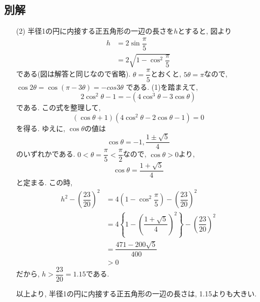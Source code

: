 \documentclass[dvipdfmx,a4paper]{jsarticle}
\begin{document}
    \subsection{別解}
    \begin{itemize}
        \item [(2)] 半径1の円に内接する正五角形の一辺の長さを$h$とすると, 
        図より
        \begin{align*}
            h &= 2 \sin \dfrac{\pi}{5} \\
            &= 2 \sqrt{1 - \cos^2 \dfrac{\pi}{5}}
        \end{align*}
        である(図は解答と同じなので省略). 
        $\theta = \dfrac{\pi}{5}$とおくと, $5\theta = \pi$なので, $\cos 2\theta = \cos (\pi - 3\theta) = - cos 3\theta$
        である. (1)を踏まえて, 
        \begin{equation*}
            2\cos^2 \theta -1 = - \left(4\cos^3 \theta -3 \cos \theta \right)
        \end{equation*}
        である. この式を整理して, 
        \begin{equation*}
            (\cos \theta + 1)(4 \cos^2 \theta -2 \cos \theta -1) = 0
        \end{equation*}
        を得る. ゆえに, $\cos \theta$の値は
        \begin{equation*}
            \cos \theta = -1, \dfrac{1 \pm \sqrt{5}}{4}
        \end{equation*}
        のいずれかである. $0 < \theta = \dfrac{\pi}{5} < \dfrac{\pi}{2}$なので, 
        $\cos \theta > 0$より, 
        \begin{equation*}
            \cos \theta = \dfrac{1 + \sqrt{5}}{4}
        \end{equation*}
        と定まる. 
        この時, 
        \begin{align*}
            h^2 - \left(\dfrac{23}{20}\right)^2 
            &= 4\left(1 - \cos^2 \dfrac{\pi}{5}\right) - \left(\dfrac{23}{20}\right)^2\\
            &= 4\left\{1 - \left(\dfrac{1 + \sqrt{5}}{4} \right)^2\right\}- \left(\dfrac{23}{20}\right)^2 \\
            &= \dfrac{471-200\sqrt{5}}{400} \\
            & > 0
        \end{align*}
        だから, $h > \dfrac{23}{20} = 1.15$である. 
    
        以上より, 半径1の円に内接する正五角形の一辺の長さは, 1.15よりも大きい. 
    
    \end{itemize}
\end{document}
